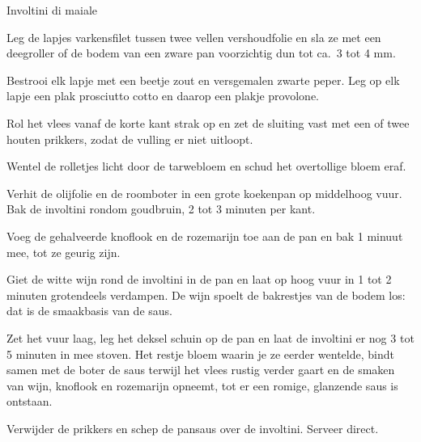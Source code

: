 \begin{recipe}{Involtini di maiale}
\begin{steps}
  \item Leg de lapjes varkensfilet tussen twee vellen vershoudfolie en sla ze
        met een deegroller of de bodem van een zware pan voorzichtig dun tot
        ca.\ 3 tot 4 mm.
  \item Bestrooi elk lapje met een beetje zout en versgemalen zwarte peper.
        Leg op elk lapje een plak prosciutto cotto en daarop een plakje
        provolone.
  \item Rol het vlees vanaf de korte kant strak op en zet de sluiting vast
        met een of twee houten prikkers, zodat de vulling er niet uitloopt.
  \item Wentel de rolletjes licht door de tarwebloem en schud het
        overtollige bloem eraf.
  \item Verhit de olijfolie en de roomboter in een grote koekenpan op
        middelhoog vuur. Bak de involtini rondom goudbruin, 2 tot 3 minuten
        per kant.
  \item Voeg de gehalveerde knoflook en de rozemarijn toe aan de pan en bak
        1 minuut mee, tot ze geurig zijn.
  \item Giet de witte wijn rond de involtini in de pan en laat op hoog vuur
        in 1 tot 2 minuten grotendeels verdampen. De wijn spoelt de
        bakrestjes van de bodem los: dat is de smaakbasis van de saus.
  \item Zet het vuur laag, leg het deksel schuin op de pan en laat de
        involtini er nog 3 tot 5 minuten in mee stoven. Het restje bloem
        waarin je ze eerder wentelde, bindt samen met de boter de saus
        terwijl het vlees rustig verder gaart en de smaken van wijn,
        knoflook en rozemarijn opneemt, tot er een romige, glanzende saus is
        ontstaan.
  \item Verwijder de prikkers en schep de pansaus over de involtini. Serveer
        direct.
\end{steps}

\end{recipe}
